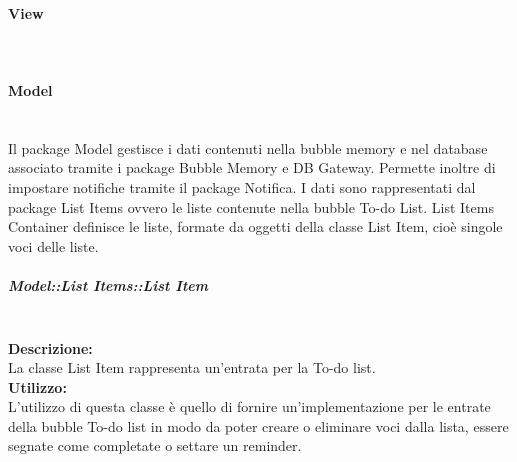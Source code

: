 
\begin{samepage}
\paragraph{View}\mbox{}\\
\end{samepage}

\paragraph{Model}\mbox{}\\
Il package Model gestisce i dati contenuti nella bubble memory e nel database associato tramite i package Bubble Memory e DB Gateway. Permette inoltre di impostare notifiche tramite il package Notifica. I dati sono rappresentati dal package List Items ovvero le liste contenute nella bubble To-do List. List Items Container definisce le liste, formate da oggetti della classe List Item, cioè singole voci delle liste. 


\subparagraph{Model::List Items::List Item}\label{todo-item}\mbox{}\\
\textbf{Descrizione:}\\
La classe List Item rappresenta un’entrata per la To-do list.\\
\textbf{Utilizzo:}\\
L’utilizzo di questa classe è quello di fornire un’implementazione per le entrate della bubble To-do list in modo da poter creare o eliminare voci dalla lista, essere segnate come completate o settare un reminder.\\

